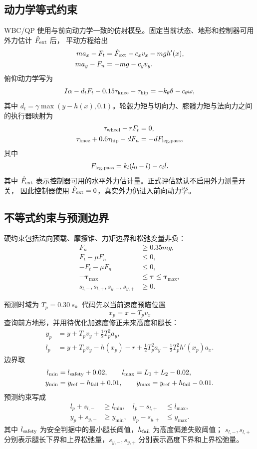 \documentclass[UTF8,12pt,a4paper,fontset=none]{ctexart}
\begin{document}
\subsection{动力学等式约束}
WBC/QP 使用与前向动力学一致的仿射模型。固定当前状态、地形和控制器可用外力估计 $\hat F_{\rm ext}$ 后，
平动方程给出
\begin{align}
ma_x-F_t&=\hat F_{\rm ext}-c_xv_x-mgh'(x),\\
ma_y-F_n&=-mg-c_yv_y.
\end{align}
俯仰动力学写为
\begin{equation}
I\alpha-d_tF_t-0.15\tau_{\rm knee}-\tau_{\rm hip}
=-k_\theta\theta-c_\theta\omega,
\end{equation}
其中 $d_t=\gamma\max(y-h(x),0.1)$。轮毂力矩与切向力、膝髋力矩与法向力之间的执行器映射为
\begin{align}
\tau_{\rm wheel}-rF_t&=0,\\
\tau_{\rm knee}+0.6\tau_{\rm hip}-dF_n&=-dF_{\rm leg,pass},
\end{align}
其中
\begin{equation}
F_{\rm leg,pass}=k_l(l_0-l)-c_l\dot l.
\end{equation}
其中 $\hat F_{\rm ext}$ 表示控制器可用的水平外力估计量。正式评估默认不启用外力测量开关，
因此控制器使用 $\hat F_{\rm ext}=0$，真实外力仍进入前向动力学。

\subsection{不等式约束与预测边界}
硬约束包括法向预载、摩擦锥、力矩边界和松弛变量非负：
\begin{align}
F_n&\ge0.35mg,\\
F_t-\mu F_n&\le0,\\
-F_t-\mu F_n&\le0,\\
-\bm\tau_{\max}&\le\bm\tau\le\bm\tau_{\max},\\
s_{l,-},s_{l,+},s_{y,-},s_{y,+}&\ge0.
\end{align}

预测时域为 $T_p=\SI{0.30}{s}$。代码先以当前速度预瞄位置
\begin{equation}
x_p=x+T_pv_x
\end{equation}
查询前方地形，并用待优化加速度修正未来高度和腿长：
\begin{align}
y_p&=y+T_pv_y+\frac12T_p^2a_y,\\
l_p&=y+T_pv_y-h(x_p)-r
+\frac12T_p^2a_y-\frac12T_p^2h'(x_p)a_x.
\end{align}
边界取
\begin{align}
l_{\min}&=l_{\rm safety}+0.02,\qquad
l_{\max}=L_1+L_2-0.02,\\
y_{\min}&=y_{\rm ref}-h_{\rm fail}+0.01,\qquad
y_{\max}=y_{\rm ref}+h_{\rm fail}-0.01.
\end{align}
预测约束写成
\begin{align}
l_p+s_{l,-}&\ge l_{\min},&
l_p-s_{l,+}&\le l_{\max},\\
y_p+s_{y,-}&\ge y_{\min},&
y_p-s_{y,+}&\le y_{\max}.
\end{align}
其中 $l_{\rm safety}$ 为安全判据中的最小腿长阈值，$h_{\rm fail}$ 为高度偏差失败阈值；
$s_{l,-},s_{l,+}$ 分别表示腿长下界和上界松弛量，$s_{y,-},s_{y,+}$ 分别表示高度下界和上界松弛量。
\end{document}
